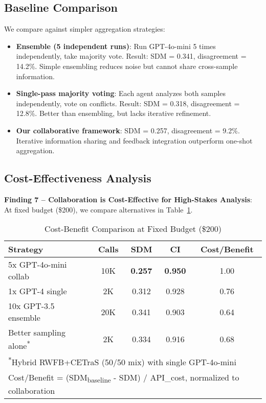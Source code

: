 \documentclass[conference]{IEEEtran}
\begin{document}
\subsection{Baseline Comparison}

We compare against simpler aggregation strategies:
\begin{itemize}
    \item \textbf{Ensemble (5 independent runs)}: Run GPT-4o-mini 5 times independently, take majority vote. Result: SDM = 0.341, disagreement = 14.2\%. Simple ensembling reduces noise but cannot share cross-sample information.
    \item \textbf{Single-pass majority voting}: Each agent analyzes both samples independently, vote on conflicts. Result: SDM = 0.318, disagreement = 12.8\%. Better than ensembling, but lacks iterative refinement.
    \item \textbf{Our collaborative framework}: SDM = 0.257, disagreement = 9.2\%. Iterative information sharing and feedback integration outperform one-shot aggregation.
\end{itemize}

\subsection{Cost-Effectiveness Analysis}

\textbf{Finding 7 -- Collaboration is Cost-Effective for High-Stakes Analysis}: At fixed budget (\$200), we compare alternatives in Table~\ref{tab:cost-benefit}.

\begin{table}[htbp]
\centering
\caption{Cost-Benefit Comparison at Fixed Budget (\$200)}
\label{tab:cost-benefit}
\small
\begin{tabular}{l c c c c}
\toprule
\textbf{Strategy} & \textbf{Calls} & \textbf{SDM} & \textbf{CI} & \textbf{Cost/Benefit} \\
\midrule
5x GPT-4o-mini collab & 10K & \textbf{0.257} & \textbf{0.950} & 1.00 \\
1x GPT-4 single & 2K & 0.312 & 0.928 & 0.76 \\
10x GPT-3.5 ensemble & 20K & 0.341 & 0.903 & 0.64 \\
Better sampling alone\textsuperscript{*} & 2K & 0.334 & 0.916 & 0.68 \\
\bottomrule
\multicolumn{5}{l}{\footnotesize \textsuperscript{*}Hybrid RWFB+CETraS (50/50 mix) with single GPT-4o-mini} \\
\multicolumn{5}{l}{\footnotesize Cost/Benefit = (SDM\textsubscript{baseline} - SDM) / API\_cost, normalized to collaboration}
\end{tabular}
\end{table}
\end{document}
